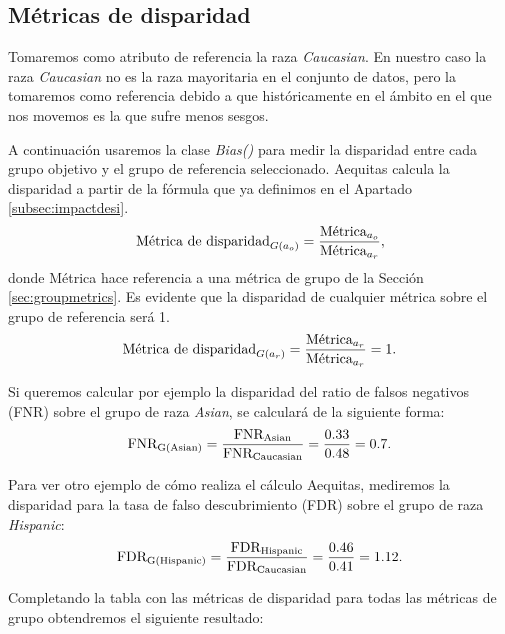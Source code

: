 \subsection*{Métricas de disparidad}

Tomaremos como atributo de referencia la raza \textit{Caucasian}. En nuestro caso la raza \textit{Caucasian} no es la raza mayoritaria en el conjunto de datos, pero la tomaremos como referencia debido a que históricamente en el ámbito en el que nos movemos es la que sufre menos sesgos.

A continuación usaremos la clase \textit{Bias()} para medir la disparidad entre cada grupo objetivo y el grupo de referencia seleccionado. Aequitas calcula la disparidad a partir de la fórmula que ya definimos en el Apartado \ref{subsec:impactdesi}. $$\text{Métrica de disparidad}_{G(a_o)}=\frac{\displaystyle \text{Métrica}_{a_o}}{\displaystyle \text{Métrica}_{a_r}},$$ donde Métrica hace referencia a una métrica de grupo de la Sección \ref{sec:groupmetrics}. Es evidente que la disparidad de cualquier métrica sobre el grupo de referencia será 1. $$\text{Métrica de disparidad}_{G(a_r)}=\frac{\displaystyle \text{Métrica}_{a_r}}{\displaystyle \text{Métrica}_{a_r}}=1.$$

Si queremos calcular por ejemplo la disparidad del ratio de falsos negativos (FNR) sobre el grupo de raza \textit{Asian}, se calculará de la siguiente forma: $$\text{FNR}_{\text{G(Asian)}}=\frac{\displaystyle \text{FNR}_{\text{Asian}}}{\displaystyle \text{FNR}_{\text{Caucasian}}}=\frac{\displaystyle 0.33}{\displaystyle 0.48}=0.7.$$

Para ver otro ejemplo de cómo realiza el cálculo Aequitas, mediremos la disparidad para la tasa de falso descubrimiento (FDR) sobre el grupo de raza \textit{Hispanic}:
$$\text{FDR}_{\text{G(Hispanic)}}=\frac{\displaystyle \text{FDR}_{\text{Hispanic}}}{\displaystyle \text{FDR}_{\text{Caucasian}}}=\frac{\displaystyle 0.46}{\displaystyle 0.41}=1.12.$$

Completando la tabla con las métricas de disparidad para todas las métricas de grupo obtendremos el siguiente resultado:

